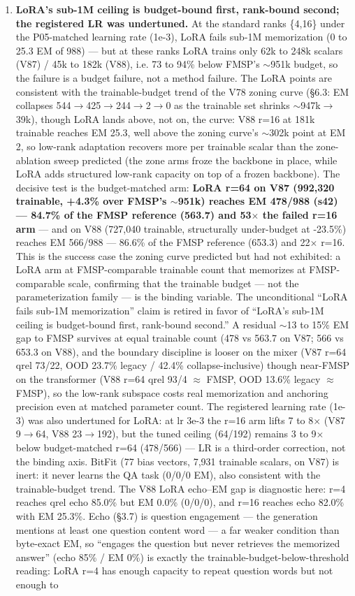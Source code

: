 \documentclass[11pt]{article}
\begin{document}
\begin{enumerate}
\item \textbf{LoRA's sub-1M ceiling is budget-bound first, rank-bound second; the registered LR was undertuned.} At the standard ranks \{4,16\} under the P05-matched learning rate (1e-3), LoRA fails sub-1M memorization (0 to 25.3 EM of 988) --- but at these ranks LoRA trains only 62k to 248k scalars (V87) / 45k to 182k (V88), i.e. 73 to 94\% below FMSP's $\sim$951k budget, so the failure is a budget failure, not a method failure. The LoRA points are consistent with the trainable-budget trend of the V78 zoning curve (\S6.3: EM collapses 544$\to$425$\to$244$\to$2$\to$0 as the trainable set shrinks $\sim$947k$\to$39k), though LoRA lands above, not on, the curve: V88 r=16 at 181k trainable reaches EM 25.3, well above the zoning curve's $\sim$302k point at EM 2, so low-rank adaptation recovers more per trainable scalar than the zone-ablation sweep predicted (the zone arms froze the backbone in place, while LoRA adds structured low-rank capacity on top of a frozen backbone). The decisive test is the budget-matched arm: \textbf{LoRA r=64 on V87 (992{,}320 trainable, +4.3\% over FMSP's $\sim$951k) reaches EM 478/988 (s42) --- 84.7\% of the FMSP reference (563.7) and 53$\times$ the failed r=16 arm} --- and on V88 (727{,}040 trainable, structurally under-budget at -23.5\%) reaches EM 566/988 --- 86.6\% of the FMSP reference (653.3) and 22$\times$ r=16. This is the success case the zoning curve predicted but had not exhibited: a LoRA arm at FMSP-comparable trainable count that memorizes at FMSP-comparable scale, confirming that the trainable budget --- not the parameterization family --- is the binding variable. The unconditional ``LoRA fails sub-1M memorization'' claim is retired in favor of ``LoRA's sub-1M ceiling is budget-bound first, rank-bound second.'' A residual $\sim$13 to 15\% EM gap to FMSP survives at equal trainable count (478 vs 563.7 on V87; 566 vs 653.3 on V88), and the boundary discipline is looser on the mixer (V87 r=64 qrel 73/22, OOD 23.7\% legacy / 42.4\% collapse-inclusive) though near-FMSP on the transformer (V88 r=64 qrel 93/4 $\approx$ FMSP, OOD 13.6\% legacy $\approx$ FMSP), so the low-rank subspace costs real memorization and anchoring precision even at matched parameter count. The registered learning rate (1e-3) was also undertuned for LoRA: at lr 3e-3 the r=16 arm lifts 7 to 8$\times$ (V87 9$\to$64, V88 23$\to$192), but the tuned ceiling (64/192) remains 3 to 9$\times$ below budget-matched r=64 (478/566) --- LR is a third-order correction, not the binding axis. BitFit (77 bias vectors, 7{,}931 trainable scalars, on V87) is inert: it never learns the QA task (0/0/0 EM), also consistent with the trainable-budget trend. The V88 LoRA echo--EM gap is diagnostic here: r=4 reaches qrel echo 85.0\% but EM 0.0\% (0/0/0), and r=16 reaches echo 82.0\% with EM 25.3\%. Echo (\S3.7) is question engagement --- the generation mentions at least one question content word --- a far weaker condition than byte-exact EM, so ``engages the question but never retrieves the memorized answer'' (echo 85\% / EM 0\%) is exactly the trainable-budget-below-threshold reading: LoRA r=4 has enough capacity to repeat question words but not enough to 
\end{enumerate}
\end{document}
